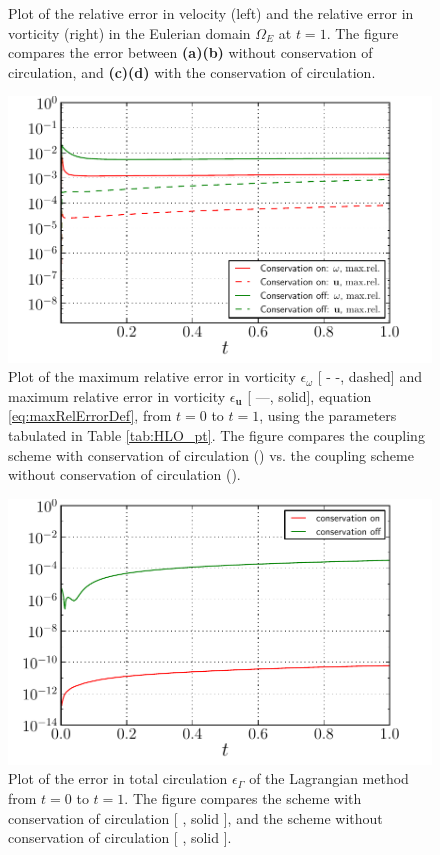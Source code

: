 \begin{figure}[!b]
     \caption{Plot of the relative error in velocity (left) and the relative error in vorticity (right) in the Eulerian domain $\Omega_E$ at $t=1$. The figure compares the error between \textbf{(a)}\textbf{(b)} without conservation of circulation, and \textbf{(c)}\textbf{(d)} with the conservation of circulation.}
     \label{fig:lambOseen_conservation_contourf}
	\end{figure}
	
	\begin{figure}[!p]
	\centering
	\includegraphics[width=0.6\linewidth]{./figures/validation/lambOseent2/lambOseen_comparision_conservation_compressed.pdf}
	\caption{Plot of the maximum relative error in vorticity $\epsilon_{\omega}$ [ - -, dashed] and maximum relative error in vorticity $\epsilon_{\mathbf{u}}$ [ ---, solid], equation \ref{eq:maxRelErrorDef}, from $t=0$ to $t=1$, using the parameters tabulated in Table \ref{tab:HLO_pt}. The figure compares the coupling scheme with conservation of circulation ({}) vs. the coupling scheme without conservation of circulation ({}).}
	\label{fig:lambOseen_comparision_conservation}
	\end{figure}	

	\begin{figure}[!p]
	\centering
	\includegraphics[width=0.6\linewidth]{./figures/validation/lambOseent2/lambOseen_comparision_conservation_circulation_compressed.pdf}
	\caption{Plot of the error in total circulation $\epsilon_{\Gamma}$ of the Lagrangian method from $t=0$ to $t=1$. The figure compares the scheme with conservation of circulation [ {\color{plotRed}{\textbf{---}}}, solid {}], and the scheme without conservation of circulation [ {\color{plotGreen}{\textbf{---}}}, solid {}].}
	\label{fig:lambOseen_comparision_conservation_circulation}
	\end{figure}	
	

